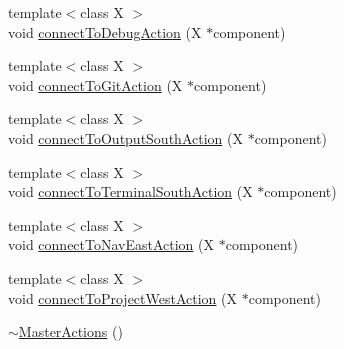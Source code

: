 \begin{DoxyCompactItemize}
\item 
{\footnotesize template$<$class X $>$ }\\void \hyperlink{class_master_actions_a9c1baa889fbb545dc9607044839d5813}{connect\-To\-Debug\-Action} (X $\ast$component)
\item 
{\footnotesize template$<$class X $>$ }\\void \hyperlink{class_master_actions_a6624b38f9a52128e261d78f0313fa99d}{connect\-To\-Git\-Action} (X $\ast$component)
\item 
{\footnotesize template$<$class X $>$ }\\void \hyperlink{class_master_actions_a0ccac38f3166e1410f09f20e27b0d020}{connect\-To\-Output\-South\-Action} (X $\ast$component)
\item 
{\footnotesize template$<$class X $>$ }\\void \hyperlink{class_master_actions_a9f7d8a2bd25c903cbb62be5e9a9ce8fc}{connect\-To\-Terminal\-South\-Action} (X $\ast$component)
\item 
{\footnotesize template$<$class X $>$ }\\void \hyperlink{class_master_actions_ab8028a378675e16f2d9ae4a42a7114be}{connect\-To\-Nav\-East\-Action} (X $\ast$component)
\item 
{\footnotesize template$<$class X $>$ }\\void \hyperlink{class_master_actions_ad8311d5ad31b045095be98a9e29db1bf}{connect\-To\-Project\-West\-Action} (X $\ast$component)
\item 
\hyperlink{class_master_actions_a2504de3ca736a30530296fc9b44fb55b}{$\sim$\-Master\-Actions} ()
\end{DoxyCompactItemize}
